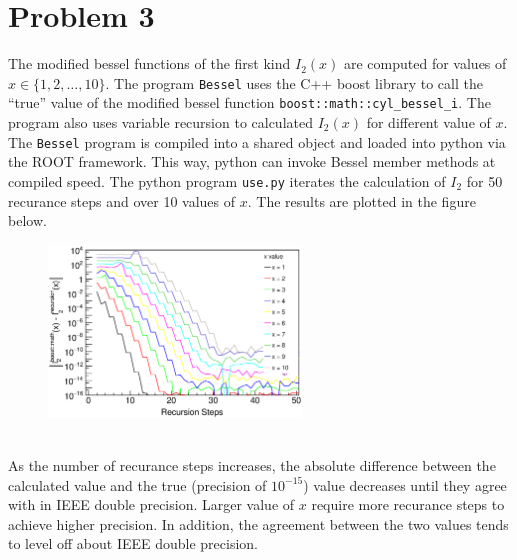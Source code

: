 \documentclass[preprint,notitlepage,nofootinbib]{revtex4-1}
\begin{document}
\section{Problem 3}
The modified bessel functions of the first kind $I_2(x)$ are computed for values of $x\in\{1,2,\dots,10\}$. The program \verb|Bessel| uses the C++ boost library to call the ``true'' value of the modified bessel function \verb|boost::math::cyl_bessel_i|. The program also uses variable recursion to calculated $I_2(x)$ for different value of $x$. The \verb|Bessel| program is compiled into a shared object and loaded into python via the ROOT framework. This way, python can invoke Bessel member methods at compiled speed. The python program \verb|use.py| iterates the calculation of $I_2$ for 50 recurance steps and over 10 values of $x$. The results are plotted in the figure below. 
\begin{figure}[h]
\centering
\includegraphics[width=0.6\textwidth]{figures/modified_bessel.eps}
\end{figure}\\
\indent As the number of recurance steps increases, the absolute difference between the calculated value and the true (precision of $10^{-15}$) value decreases until they agree with in IEEE double precision. Larger value of $x$ require more recurance steps to achieve higher precision. In addition, the agreement between the two values tends to level off about IEEE double precision.
\end{document}
